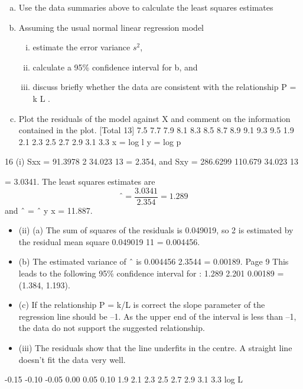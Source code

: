 \documentclass[a4paper,12pt]{article}
\begin{document}
\begin{enumerate}[(a)]
\item Use the data summaries above to calculate the least squares estimates
\item Assuming the usual normal linear regression model

\begin{enumerate}[(i)]
\item estimate the error variance $s^2$,
\item calculate a 95\% confidence interval for b, and
\item discuss briefly whether the data are consistent with the
relationship P = k L . 
\end{enumerate}

\item Plot the residuals of the model against X and comment on the
information contained in the plot. 
[Total 13]
7.5
7.7
7.9
8.1
8.3
8.5
8.7
8.9
9.1
9.3
9.5
1.9 2.1 2.3 2.5 2.7 2.9 3.1 3.3
x = log l
y = log p
\end{enumerate}
\newpage

16 (i) Sxx = 91.3978 
2 34.023
13
= 2.354, and
Sxy = 286.6299 
110.679 34.023
13

= 3.0341.
The least squares estimates are \[ˆ =
\frac{3.0341}{2.354}= 1.289\] and
ˆ
= ˆ
y  x = 11.887.
\begin{itemize}
    \item (ii) (a) The sum of squares of the residuals is 0.049019, so 2 is estimated
by the residual mean square 0.049019
11 = 0.004456.
\item (b) The estimated variance of ˆ is 0.004456
2.3544 = 0.00189.
Page 9
This leads to the following 95\% confidence interval for :
1.289  2.201 0.00189 = (1.384, 1.193).
\item (c) If the relationship P = k/L is correct the slope parameter of the
regression line should be –1. As the upper end of the interval is
less than –1, the data do not support the suggested relationship.
\item (iii)
The residuals show that the line underfits in the centre. A straight line
doesn’t fit the data very well.
\end{itemize}
-0.15
-0.10
-0.05
0.00
0.05
0.10
1.9 2.1 2.3 2.5 2.7 2.9 3.1 3.3
log L
\end{document}
